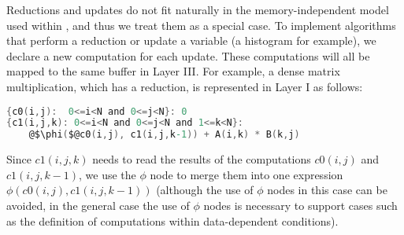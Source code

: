 Reductions and updates do not fit naturally in the memory-independent model used within \framework{}, and thus we treat them as a special case.  To implement algorithms that perform a reduction or update a variable (a histogram for example), we declare a new computation for each update.  These computations will all be mapped to the same buffer in Layer III.
For example, a dense matrix multiplication, which has a reduction, is represented in Layer I as follows:

\begin{lstlisting}[language=C,escapechar=@,numbers=none]
{c0(i,j):  0<=i<N and 0<=j<N}: 0
{c1(i,j,k): 0<=i<N and 0<=j<N and 1<=k<N}:
    @$\phi($@c0(i,j), c1(i,j,k-1)) + A(i,k) * B(k,j)
\end{lstlisting}


Since $c1(i,j,k)$ needs to read the results of the computations $c0(i,j)$ and $c1(i,j,k-1)$, we use the $\phi$ node to merge them into one expression $\phi(c0(i,j), c1(i,j,k-1))$ (although the use of $\phi$ nodes in this case can be avoided, in the general case the use of $\phi$ nodes is necessary to support  cases such as the definition of computations within data-dependent conditions).




